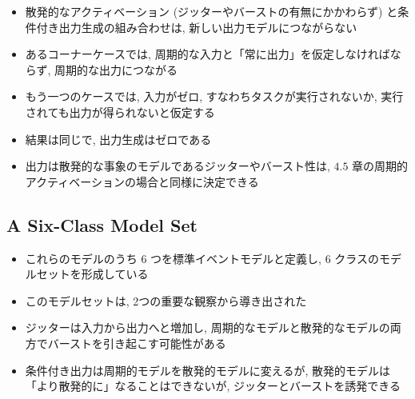 \begin{frame}{}
    \begin{itemize}
        \item 散発的なアクティベーション (ジッターやバーストの有無にかかわらず) と条件付き出力生成の組み合わせは, 新しい出力モデルにつながらない
        \item あるコーナーケースでは, 周期的な入力と「常に出力」を仮定しなければならず, 周期的な出力につながる
        \item もう一つのケースでは, 入力がゼロ, すなわちタスクが実行されないか, 実行されても出力が得られないと仮定する
        \item 結果は同じで, 出力生成はゼロである
        \item 出力は散発的な事象のモデルであるジッターやバースト性は, $4.5$ 章の周期的アクティベーションの場合と同様に決定できる
    \end{itemize}
\end{frame}


\subsection{A Six-Class Model Set}
\label{ssec: a six-class model set}

\begin{frame}{}
\end{frame}

\begin{frame}{}
    \begin{itemize}
        \item これらのモデルのうち 6 つを標準イベントモデルと定義し, 6 クラスのモデルセットを形成している
        \item このモデルセットは, 2つの重要な観察から導き出された
        \item ジッターは入力から出力へと増加し, 周期的なモデルと散発的なモデルの両方でバーストを引き起こす可能性がある
        \item 条件付き出力は周期的モデルを散発的モデルに変えるが, 散発的モデルは「より散発的に」なることはできないが, ジッターとバーストを誘発できる
    \end{itemize}
\end{frame}

